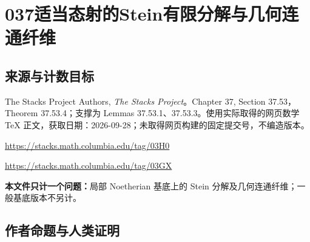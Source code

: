 \documentclass[UTF8,11pt]{ctexart}
\theoremstyle{definition}
\begin{document}
\section*{037\quad 适当态射的Stein有限分解与几何连通纤维}
\subsection*{来源与计数目标}
The Stacks Project Authors, \emph{The Stacks Project}。Chapter 37, Section 37.53，Theorem 37.53.4；支撑为 Lemmas 37.53.1、37.53.3。使用实际取得的网页数学 TeX 正文，获取日期：2026-09-28；未取得网页构建的固定提交号，不编造版本。
\par\url{https://stacks.math.columbia.edu/tag/03H0}
\par\url{https://stacks.math.columbia.edu/tag/03GX}

\par\textbf{本文件只计一个问题：}局部 Noetherian 基底上的 Stein 分解及几何连通纤维；一般基底版本不另计。
\subsection*{作者命题与人类证明}
\end{document}
